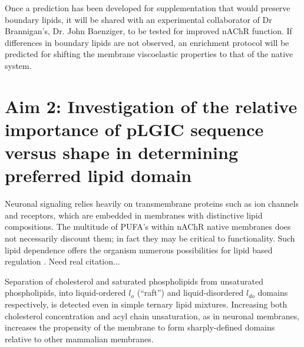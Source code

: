 \documentclass{article}
\begin{document}
Once a prediction has been developed for supplementation that would preserve boundary lipids, it will be shared with an experimental collaborator of Dr Brannigan’s, Dr. John Baenziger, to be tested for improved nAChR function. If differences in boundary lipids are not observed, an enrichment protocol will be predicted for shifting the membrane viscoelastic properties to that of the native system.

\section{Aim 2: Investigation of the relative importance of pLGIC sequence versus shape in determining preferred lipid domain}

Neuronal signaling relies heavily on transmembrane proteins such as ion channels and receptors, which are embedded in membranes with distinctive lipid compositions. The multitude of PUFA's within nAChR native membranes does not necessarily discount them; in fact they may be critical to functionality. Such lipid dependence offers the organism numerous possibilities for lipid based regulation \cite{Lennon2003}. Need real citation...


Separation of cholesterol and saturated phospholipids from unsaturated phospholipids, into liquid-ordered $l_o$ (“raft”) and liquid-disordered $l_{do}$ domains respectively, is detected even in simple ternary lipid mixtures. Increasing both cholesterol concentration and acyl chain unsaturation, as in neuronal membranes, increases the propensity of the membrane to form sharply-defined domains relative to other mammalian membranes.
\end{document}
